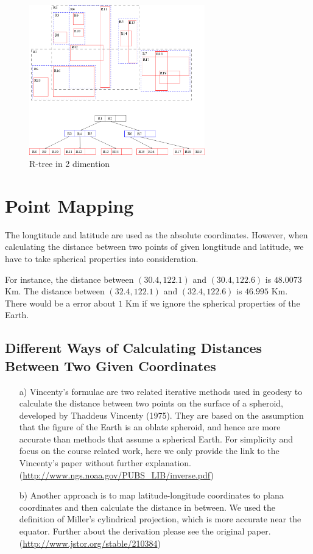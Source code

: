 \documentclass[final,1p,times]{elsarticle}
\begin{document}
\begin{figure}[thpb]
      \centering
      \includegraphics[width=3in]{R-tree.png}
      \caption{R-tree in 2 dimention}
      \label{fig:Rtree}
\end{figure}


\section{Point Mapping}
The longtitude and latitude are used as the absolute coordinates. However, when calculating the distance between two points of given longtitude and latitude, we have to take spherical properties into consideration.

For instance, the distance between $(30.4, 122.1)$ and $(30.4, 122.6)$ is $48.0073$ Km. The distance between $(32.4, 122.1)$ and $(32.4, 122.6)$ is $46.995$ Km. There would be a error about $1$ Km if we ignore the spherical properties of the Earth.

\subsection{Different Ways of Calculating Distances Between Two Given Coordinates}
\begin{enumerate}
\item[a)] Vincenty's formulae are two related iterative methods used in geodesy to calculate the distance between two points on the surface of a spheroid, developed by Thaddeus Vincenty (1975). They are based on the assumption that the figure of the Earth is an oblate spheroid, and hence are more accurate than methods that assume a spherical Earth.
For simplicity and focus on the course related work, here we only provide the link to the Vincenty’s paper without further explanation. 
(\url{http://www.ngs.noaa.gov/PUBS_LIB/inverse.pdf})

\item[b)] Another approach is to map latitude-longitude coordinates to plana coordinates and then calculate the distance in between. We used the definition of Miller’s cylindrical projection, which is more accurate near the equator. Further about the derivation please see the original paper. (\url{http://www.jstor.org/stable/210384})
\end{enumerate}
\end{document}
